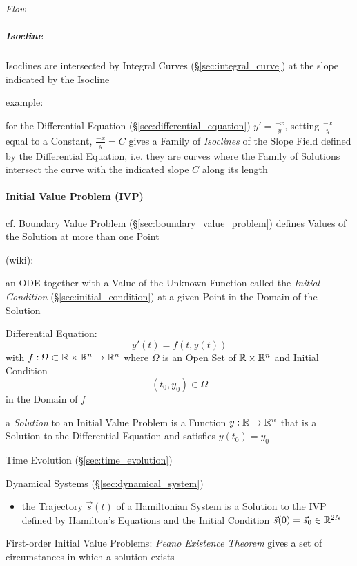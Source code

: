 \emph{Flow}



\subparagraph{Isocline}\label{sec:isocline}\hfill

Isoclines are intersected by Integral Curves (\S\ref{sec:integral_curve}) at
the slope indicated by the Isocline

example:

for the Differential Equation (\S\ref{sec:differential_equation}) $y' =
\frac{-x}{y}$, setting $\frac{-x}{y}$ equal to a Constant, $\frac{-x}{y} = C$
gives a Family of \emph{Isoclines} of the Slope Field defined by the
Differential Equation, i.e. they are curves where the Family of Solutions
intersect the curve with the indicated slope $C$ along its length



\paragraph{Initial Value Problem (IVP)}\label{sec:ivp}\hfill

\fist cf. Boundary Value Problem (\S\ref{sec:boundary_value_problem}) defines
Values of the Solution at more than one Point

(wiki):

an ODE together with a Value of the Unknown Function called the \emph{Initial
  Condition} (\S\ref{sec:initial_condition}) at a given Point in the Domain of
the Solution

Differential Equation:
\[
  y'(t) = f(t, y(t))
\]
with $f : \Omega \subset \mathbb{R} \times \mathbb{R}^n \rightarrow \mathbb{R}^n$ where
$\Omega$ is an Open Set of $\mathbb{R} \times \mathbb{R}^n$ and Initial Condition
\[
  (t_0, y_0) \in \Omega
\]
in the Domain of $f$

a \emph{Solution} to an Initial Value Problem is a Function $y : \mathbb{R}
\rightarrow \mathbb{R}^n$ that is a Solution to the Differential Equation and
satisfies $y(t_0) = y_0$

\fist Time Evolution (\S\ref{sec:time_evolution})

\fist Dynamical Systems (\S\ref{sec:dynamical_system})

\begin{itemize}
  \item the Trajectory $\vec{s}(t)$ of a Hamiltonian System is a Solution to
    the IVP defined by Hamilton's Equations and the Initial Condition
    $\vec{s}(0) = \vec{s}_0 \in \mathbb{R}^{2N}$
\end{itemize}

First-order Initial Value Problems: \emph{Peano Existence Theorem} gives a set
of circumstances in which a solution exists

